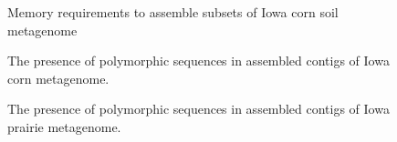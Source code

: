 \documentclass[11pt]{article} %
\begin{document}
\begin{figure}[ht]
\caption{Memory requirements to assemble subsets of Iowa corn soil
  metagenome}
\label{memory}
\end{figure}

\begin{figure}[ht]
\caption{The presence of polymorphic sequences in assembled contigs of
  Iowa corn metagenome.}
\label{corn-poly}
\end{figure}

\begin{figure}[ht]
\caption{The presence of polymorphic sequences in assembled contigs of
  Iowa prairie metagenome.}
\label{prairie-poly}
\end{figure}
\end{document}
